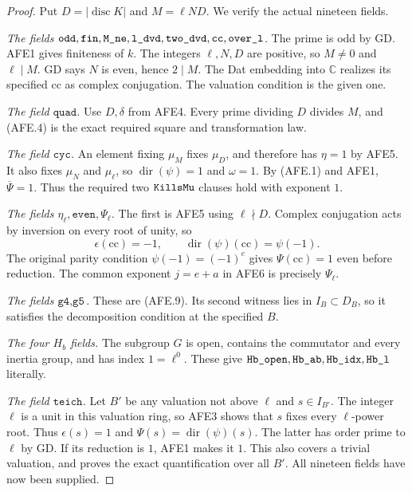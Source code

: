 \documentclass[11pt,a4paper]{article}
\numberwithin{equation}{section}
\theoremstyle{remark}\newtheorem{remark}[theorem]{Remark}
\begin{document}
\begin{proof}
Put \(D=|\operatorname{disc}K|\) and \(M=\ell ND\).
We verify the actual nineteen fields.

\emph{The fields \(\texttt{odd},\texttt{fin},
\texttt{M\_\allowbreak ne},\texttt{l\_\allowbreak dvd},\texttt{two\_\allowbreak dvd},
\texttt{cc},\texttt{over\_\allowbreak l}\).}
The prime is odd by GD.  AFE1 gives finiteness of \(k\).
The integers \(\ell,N,D\) are positive, so \(M\ne0\)
and \(\ell\mid M\).  GD says \(N\) is even, hence
\(2\mid M\).  The Dat embedding into \(\mathbb C\)
realizes its specified \(\mathrm{cc}\) as complex
conjugation.  The valuation condition is the given one.

\emph{The field \(\texttt{quad}\).}
Use \(D,\delta\) from AFE4.  Every prime dividing
\(D\) divides \(M\), and (AFE.4) is the exact
required square and transformation law.

\emph{The field \(\texttt{cyc}\).}
An element fixing \(\mu_M\) fixes \(\mu_D\), and
therefore has \(\eta=1\) by AFE5.
It also fixes \(\mu_N\) and \(\mu_\ell\), so
\(\operatorname{dir}(\psi)=1\) and \(\omega=1\).
By (AFE.1) and AFE1, \(\overline\Psi=1\).
Thus the required two \(\texttt{Kills\allowbreak Mu}\) clauses
hold with exponent \(1\).

\emph{The fields \(\eta_\ell,\texttt{even},\Psi_\ell\).}
The first is AFE5 using \(\ell\nmid D\).
Complex conjugation acts by inversion on every root
of unity, so
\[
       \epsilon(\mathrm{cc})=-1,\qquad
       \operatorname{dir}(\psi)(\mathrm{cc})=\psi(-1).
 \]
The original parity condition
\(\psi(-1)=(-1)^e\) gives \(\Psi(\mathrm{cc})=1\)
even before reduction.  The common exponent
\(j=e+a\) in AFE6 is precisely \(\Psi_\ell\).

\emph{The fields \(\texttt{g4},\texttt{g5}\).}
These are (AFE.9).  Its second witness lies in
\(I_B\subset D_B\), so it satisfies the decomposition
condition at the specified \(B\).

\emph{The four \(H_b\) fields.}
The subgroup \(G\) is open, contains the commutator
and every inertia group, and has index
\(1=\ell^0\).  These give
\(\texttt{Hb\_\allowbreak open},\texttt{Hb\_\allowbreak ab},\texttt{Hb\_\allowbreak idx},
\texttt{Hb\_\allowbreak l}\) literally.

\emph{The field \(\texttt{teich}\).}
Let \(B'\) be any valuation not above \(\ell\)
and \(s\in I_{B'}\).  The integer \(\ell\) is
a unit in this valuation ring, so AFE3 shows
that \(s\) fixes every \(\ell\)-power root.
Thus \(\epsilon(s)=1\) and
\(\Psi(s)=\operatorname{dir}(\psi)(s)\).
The latter has order prime to \(\ell\) by GD.
If its reduction is \(1\), AFE1 makes it \(1\).
This also covers a trivial valuation, and proves
the exact quantification over all \(B'\).
All nineteen fields have now been supplied.
\end{proof}
\end{document}
